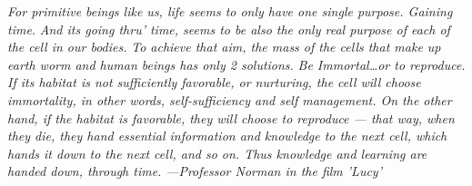 \textit{For primitive beings like us, life seems to only have one single purpose. Gaining time.}
\textit{And its going thru’ time, seems to be also the only real purpose of each of the cell in our bodies.}
\textit{To achieve that aim, the mass of the cells that make up earth worm and human beings has only 2 solutions.}
\textit{Be Immortal…or to reproduce.}
\\
\textit{If its habitat is not sufficiently favorable, or nurturing, the cell will choose immortality, in other words, self-sufficiency and self management. On the other hand, if the habitat is favorable, they will choose to reproduce — that way, when they die, they hand essential information and knowledge to the next cell, which hands it down to the next cell, and so on. Thus knowledge and learning are handed down, through time.}
\textit{---Professor Norman in the film 'Lucy'}